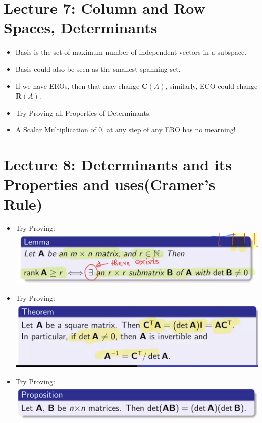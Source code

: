 \documentclass{article}
\begin{document}
\section{Lecture 7: Column and Row Spaces, Determinants}

  \begin{itemize}
    \item Basis is the set of maximum number of independent vectors in a subspace.
    \item Basis could also be seen as the smallest spanning-set.
    \item If we have EROs, then that may change $\mathbf{C}(A)$, similarly, ECO could change $\mathbf{R}(A)$.
    \item Try Proving all Properties of Determinants.
    \item A Scalar Multiplication of 0, at any step of any ERO has no mearning!
  \end{itemize}

\section{Lecture 8: Determinants and its Properties and uses(Cramer's Rule)}

\begin{itemize}
  \item Try Proving: \\
  \includegraphics[scale = 0.4]{5.png}
  \item Try Proving: \\
  \includegraphics[scale = 0.3]{6.png}
  \item Try Proving: \\
  \includegraphics[scale = 0.4]{7.png}
\end{itemize}
\end{document}
